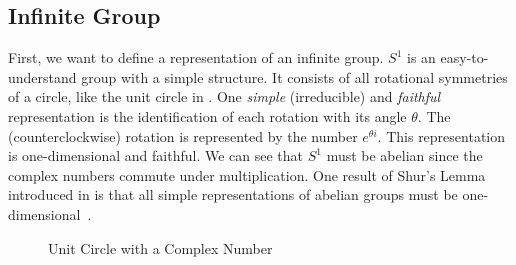 \subsection{Infinite Group}

First, we want to define a representation of an infinite group.
$S^1$ is an easy-to-understand group with a simple structure.
It consists of all rotational symmetries of a circle, like the unit circle in .
One \textit{simple} (irreducible) and \textit{faithful} representation is the identification of each rotation with its angle $\theta$.
The (counterclockwise) rotation is represented by the number $e^{\theta i}$.
This representation is one-dimensional and faithful.
We can see that $S^1$ must be abelian since the complex numbers commute under multiplication.
One result of Shur's Lemma introduced in  is that all simple representations of abelian groups must be one-dimensional~\cite{hein2013}.


\begin{figure}[!h]
    \centering


    \caption{Unit Circle with a Complex Number}
    \label{fig:infinite.group.unit}
\end{figure}
